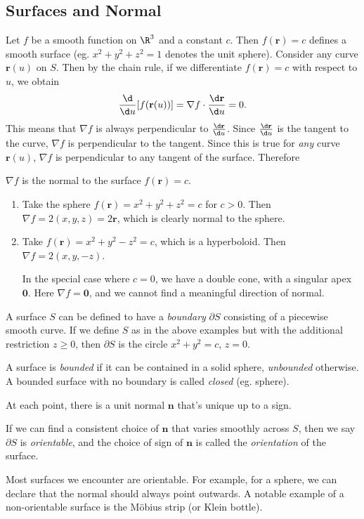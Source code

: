 \documentclass[a4paper]{article}
\begin{document}
\subsection{Surfaces and Normal}
Let $f$ be a smooth function on $\R^3$ and a constant $c$. Then $f(\mathbf{r}) = c$ defines a smooth surface (eg. $x^2 + y^2 + z^2 = 1$ denotes the unit sphere). Consider any curve $\mathbf{r}(u)$ on $S$. Then by the chain rule, if we differentiate $f(\mathbf{r}) = c$ with respect to $u$, we obtain
\[
  \frac{\d }{\d u}[f(\mathbf{r}(u))] = \nabla f\cdot \frac{\d \mathbf{r}}{\d u} = 0.
\]
This means that $\nabla f$ is always perpendicular to $\frac{\d \mathbf{r}}{\d u}$. Since $\frac{\d \mathbf{r}}{\d u}$ is the tangent to the curve, $\nabla f$ is perpendicular to the tangent. Since this is true for \emph{any} curve $\mathbf{r}(u)$, $\nabla f$ is perpendicular to any tangent of the surface. Therefore
\begin{prop}
  $\nabla f$ is the normal to the surface $f(\mathbf{r}) = c$.
\end{prop}

\begin{eg}\leavevmode
  \begin{enumerate}
    \item Take the sphere $f(\mathbf{r}) = x^2 + y^2 + z^2 = c$ for $c > 0$. Then $\nabla f = 2(x, y, z) = 2\mathbf{r}$, which is clearly normal to the sphere.
    \item Take $f(\mathbf{r}) = x^2 + y^2 - z^2 = c$, which is a hyperboloid. Then $\nabla f = 2(x, y, -z)$.
      
      In the special case where $c = 0$, we have a double cone, with a singular apex $\mathbf{0}$. Here $\nabla f = \mathbf{0}$, and we cannot find a meaningful direction of normal.
  \end{enumerate}
\end{eg}

\begin{defi}[Boundary]
  A surface $S$ can be defined to have a \emph{boundary} $\partial S$ consisting of a piecewise smooth curve. If we define $S$ as in the above examples but with the additional restriction $z \geq 0$, then $\partial S$ is the circle $x^2 + y^2 = c$, $z = 0$.

  A surface is \emph{bounded} if it can be contained in a solid sphere, \emph{unbounded} otherwise. A bounded surface with no boundary is called \emph{closed} (eg. sphere).
\end{defi}

\begin{defi}
  At each point, there is a unit normal $\mathbf{n}$ that's unique up to a sign.
 
  If we can find a consistent choice of $\mathbf{n}$ that varies smoothly across $S$, then we say $\partial S$ is \emph{orientable}, and the choice of sign of $\mathbf{n}$ is called the \emph{orientation} of the surface.
\end{defi}
Most surfaces we encounter are orientable. For example, for a sphere, we can declare that the normal should always point outwards. A notable example of a non-orientable surface is the M\"obius strip (or Klein bottle).
\end{document}
